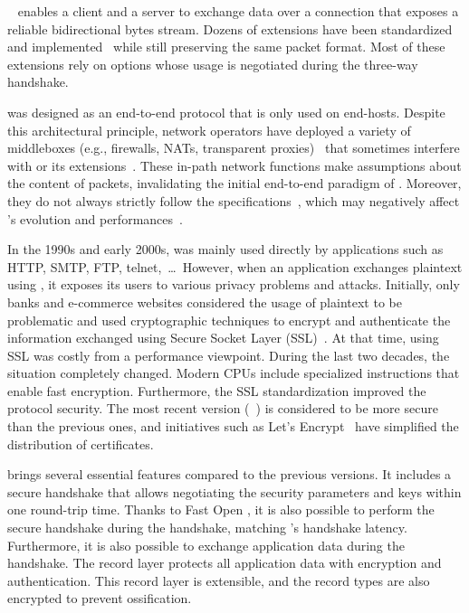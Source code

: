 


\tcp~\cite{rfc793} enables a client and a server to exchange data
over a connection that exposes a reliable bidirectional bytes stream.
Dozens of \tcp extensions have been standardized and implemented~\cite{RFC7414}
while still preserving the same packet format. Most of these extensions rely on
\tcp options whose usage is negotiated during the three-way handshake.

\tcp was designed as an end-to-end protocol that is only used on end-hosts.
Despite this architectural principle, network operators have deployed a variety
of middleboxes (e.g., firewalls, NATs, transparent proxies)~\cite{mCloud} that
sometimes interfere with \tcp or its extensions~\cite{medina2004measuring,
honda2011still, edeline2019bottom}. These in-path network functions make
assumptions about the content of \tcp packets, invalidating the initial
end-to-end paradigm of \tcp. Moreover, they do not always strictly follow the
\tcp specifications~\cite{honda2011still, hesmans2013tcp}, which may negatively
affect \tcp's evolution and performances~\cite{edeline2020evaluating}.


In the 1990s and early 2000s, \tcp was mainly used directly by applications such
as HTTP, SMTP, FTP, telnet,~\ldots~However, when an application exchanges
plaintext using \tcp, it exposes its users to various privacy problems and
attacks. Initially, only banks and e-commerce websites considered the usage of
plaintext to be problematic and used cryptographic techniques to encrypt and
authenticate the information exchanged using Secure Socket Layer
(SSL)~\cite{draft-hickman-netscape-ssl}. At that time, using SSL was costly from
a performance viewpoint. During the last two decades, the situation completely
changed. Modern CPUs include specialized instructions that enable fast
encryption. Furthermore, the SSL standardization improved the protocol security.
The most recent version (~\cite{rfc8446}) is considered to be more
secure than the previous ones, and initiatives such as Let's Encrypt~\cite{aas2019let} have simplified the distribution of certificates.

 brings several essential features compared to the previous versions. It
includes a secure handshake that allows negotiating the security parameters and
keys within one round-trip time. Thanks to \tcp Fast Open
\cite{radhakrishnan2011tcp}, it is also possible to perform the secure handshake
during the \tcp handshake, matching \quic's handshake latency. Furthermore, it is also possible to exchange
application data during the \tls handshake. The  record layer protects
all application data with encryption and authentication. This record layer is
extensible, and the \tls record types are also encrypted to prevent
ossification.

